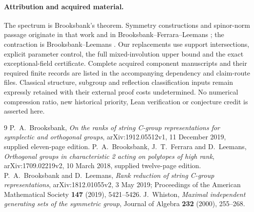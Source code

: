 \documentclass[11pt,a4paper]{article}
\begin{document}
\paragraph{Attribution and acquired material.}
The spectrum is Brooksbank's theorem. Symmetry constructions and
spinor-norm passage originate in that work and in
Brooksbank--Ferrara--Leemans \cite{BFL}; the contraction is
Brooksbank--Leemans \cite{BL}. Our replacements use support
intersections, explicit parameter control, the full mixed-involution
upper bound and the exact exceptional-field certificate. Complete
acquired component manuscripts and their required finite records are
listed in the accompanying dependency and claim-route files. Classical
structure, subgroup and reflection classification inputs remain expressly
retained with their external proof costs undetermined. No numerical
compression ratio, new historical priority, Lean verification or
conjecture credit is asserted here.

\begin{thebibliography}{9}
 P.~A.~Brooksbank, \emph{On the ranks of string C-group
representations for symplectic and orthogonal groups},
arXiv:1912.05512v1, 11 December 2019, supplied eleven-page edition.
 P.~A.~Brooksbank, J.~T.~Ferrara and D.~Leemans,
\emph{Orthogonal groups in characteristic 2 acting on polytopes
of high rank}, arXiv:1709.02219v2, 10 March 2018,
supplied twelve-page edition.
 P.~A.~Brooksbank and D.~Leemans,
\emph{Rank reduction of string C-group representations},
arXiv:1812.01055v2, 3 May 2019; Proceedings of the American
Mathematical Society \textbf{147} (2019), 5421--5426.
 J.~Whiston, \emph{Maximal independent generating sets
of the symmetric group}, Journal of Algebra \textbf{232} (2000),
255--268.
\end{thebibliography}
\end{document}

